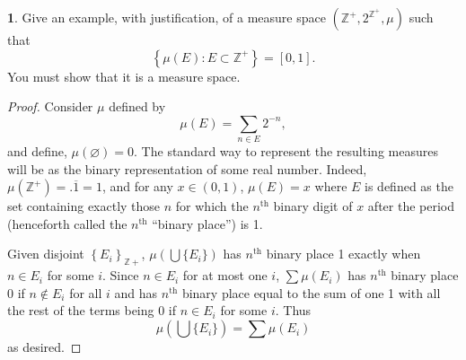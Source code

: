 \documentclass[12pt]{article}
\theoremstyle{definition}
\newtheorem{ex}{}
\newenvironment{exercise}[1]{
	\renewcommand{\theex}{#1}
	\begin{ex}
		}{\end{ex}}
\begin{document}
\begin{exercise}{1(c)}
	Give an example, with justification, of a measure space $(\mathbb{Z}^+, 2^{\mathbb{Z}^+}, \mu)$ such that \begin{equation*}
		\left\lbrace \mu(E) : E \subset \mathbb{Z}^+ \right\rbrace = [0, 1].
	\end{equation*}
	You must show that it is a measure space.
\end{exercise}
\begin{proof}
	Consider $\mu$ defined by \begin{equation*}
		\mu(E) = \sum_{n \in E} 2^{-n},
	\end{equation*}
	and define, $\mu(\varnothing) = 0$.
	The standard way to represent the resulting measures will be as the binary representation of some real number.
	Indeed, $\mu(\mathbb{Z}^+) = .\overline{1} = 1$, and for any $x \in (0, 1)$, $\mu(E) = x$ where $E$ is defined as the set containing exactly those $n$ for which the $n^{\text{th}}$ binary digit of $x$ after the period (henceforth called the $n^{\text{th}}$ ``binary place'') is 1.

	Given disjoint $\left\lbrace E_i \right\rbrace_{\mathbb{Z+}}$, $\mu(\bigcup \lbrace E_i\rbrace)$ has $n^{\text{th}}$ binary place 1 exactly when $n \in E_i$ for some $i$.
	Since $n \in E_i$ for at most one $i$, $\sum \mu(E_i)$ has $n^{\text{th}}$ binary place 0 if $n \notin E_i$ for all $i$ and has $n^{\text{th}}$ binary place equal to the sum of one 1 with all the rest of the terms being 0 if $n \in E_i$ for some $i$.
	Thus \begin{equation*}
		\mu\left(\bigcup \lbrace E_i \rbrace\right) = \sum \mu(E_i)
	\end{equation*}
	as desired.
\end{proof}
\end{document}
